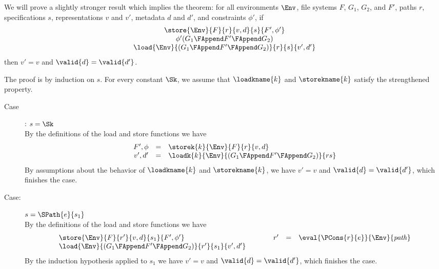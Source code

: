 %
{ We will prove a slightly stronger result which implies the theorem:
  for all environments $\Env$, file systems $F$, $G_1$, $G_2$, and
  $F'$, paths $r$, specifications $s$, representations $v$ and $v'$,
  metadata $d$ and $d'$, and constraints $\phi'$, if 
%
\[
\begin{array}{c}
  \store{\Env}{F}{r}{v,d}{s}{F',\phi'}\\
  \phi'(G_1 \FAppend F' \FAppend G_2)\\
  \load{\Env}{(G_1 \FAppend F' \FAppend G_2)}{r}{s}{v',d'}
\end{array}
\]
%
then $v' = v$ and $\valid{d} = \valid{d'}$. 

The proof is by induction on $s$. For every constant $\Sk$, we assume
that $\loadkname{k}$ and $\storekname{k}$ satisfy the strengthened
property.
\begin{description}
\item[Case]: $s = \Sk$\\[1ex]
%
By the definitions of the load and store functions we have 
\[ 
\begin{array}{rcll}
F',\phi &=& \storek{k}{\Env}{F}{r}{v,d}\\
v',d'  &=& \loadk{k}{\Env}{(G_1 \FAppend F' \FAppend G_2)}{rs}\\
\end{array}
\]
By assumptions about the behavior of $\loadkname{k}$ and
$\storekname{k}$, we have $v' = v$ and $\valid{d} = \valid{d'}$,
which finishes the case. 

\item[Case:] $s=\SPath{e}{s_1}$\\[1ex]
%
By the definitions of the load and store functions we have
\[
\begin{array}{l}
\store{\Env}{F}{r'}{v,d}{s_1}{F',\phi'}\\
\load{\Env}{(G_1 \FAppend F' \FAppend G_2)}{r'}{s_1}{v',d'}
\end{array}\hspace*{1cm}\begin{array}{rcl}
r' &=& \eval{\PCons{r}{e}}{\Env}{\mathit{path}}\\
\\
\end{array}
\]
%
By the induction hypothesis applied to $s_1$ we have $v' = v$ and
$\valid{d} = \valid{d'}$, which finishes the case.


\end{description}}
